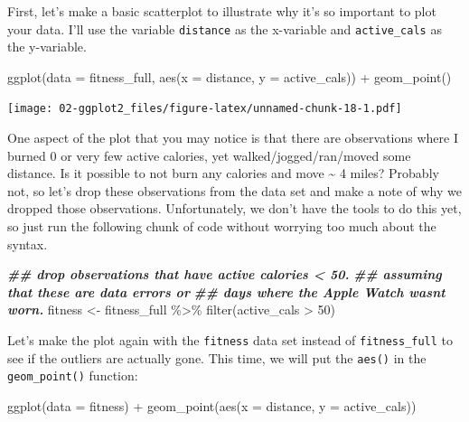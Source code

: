 \documentclass[
]{book}
\newenvironment{Shaded}{\begin{snugshade}}{\end{snugshade}}
\newcommand{\AttributeTok}[1]{\textcolor[rgb]{0.77,0.63,0.00}{#1}}
\newcommand{\DecValTok}[1]{\textcolor[rgb]{0.00,0.00,0.81}{#1}}
\newcommand{\DocumentationTok}[1]{\textcolor[rgb]{0.56,0.35,0.01}{\textbf{\textit{#1}}}}
\newcommand{\FunctionTok}[1]{\textcolor[rgb]{0.00,0.00,0.00}{#1}}
\newcommand{\NormalTok}[1]{#1}
\newcommand{\OtherTok}[1]{\textcolor[rgb]{0.56,0.35,0.01}{#1}}
\newcommand{\SpecialCharTok}[1]{\textcolor[rgb]{0.00,0.00,0.00}{#1}}
\begin{document}
First, let's make a basic scatterplot to illustrate why it's so important to plot your data. I'll use the variable \texttt{distance} as the x-variable and \texttt{active\_cals} as the y-variable.

\begin{Shaded}
\begin{Highlighting}[]
\FunctionTok{ggplot}\NormalTok{(}\AttributeTok{data =}\NormalTok{ fitness\_full, }\FunctionTok{aes}\NormalTok{(}\AttributeTok{x =}\NormalTok{ distance, }\AttributeTok{y =}\NormalTok{ active\_cals)) }\SpecialCharTok{+}
  \FunctionTok{geom\_point}\NormalTok{()}
\end{Highlighting}
\end{Shaded}

\texttt{[image: 02-ggplot2\_files/figure-latex/unnamed-chunk-18-1.pdf]}

One aspect of the plot that you may notice is that there are observations where I burned 0 or very few active calories, yet walked/jogged/ran/moved some distance. Is it possible to not burn any calories and move \textasciitilde{} 4 miles? Probably not, so let's drop these observations from the data set and make a note of why we dropped those observations. Unfortunately, we don't have the tools to do this yet, so just run the following chunk of code without worrying too much about the syntax.

\begin{Shaded}
\begin{Highlighting}[]
\DocumentationTok{\#\# drop observations that have active calories \textless{} 50. }
\DocumentationTok{\#\# assuming that these are data errors or }
\DocumentationTok{\#\# days where the Apple Watch wasn\textquotesingle{}t worn.}
\NormalTok{fitness }\OtherTok{\textless{}{-}}\NormalTok{ fitness\_full }\SpecialCharTok{\%\textgreater{}\%}
  \FunctionTok{filter}\NormalTok{(active\_cals }\SpecialCharTok{\textgreater{}} \DecValTok{50}\NormalTok{)}
\end{Highlighting}
\end{Shaded}

Let's make the plot again with the \texttt{fitness} data set instead of \texttt{fitness\_full} to see if the outliers are actually gone. This time, we will put the \texttt{aes()} in the \texttt{geom\_point()} function:

\begin{Shaded}
\begin{Highlighting}[]
\FunctionTok{ggplot}\NormalTok{(}\AttributeTok{data =}\NormalTok{ fitness) }\SpecialCharTok{+}
  \FunctionTok{geom\_point}\NormalTok{(}\FunctionTok{aes}\NormalTok{(}\AttributeTok{x =}\NormalTok{ distance, }\AttributeTok{y =}\NormalTok{ active\_cals))}
\end{Highlighting}
\end{Shaded}
\end{document}
